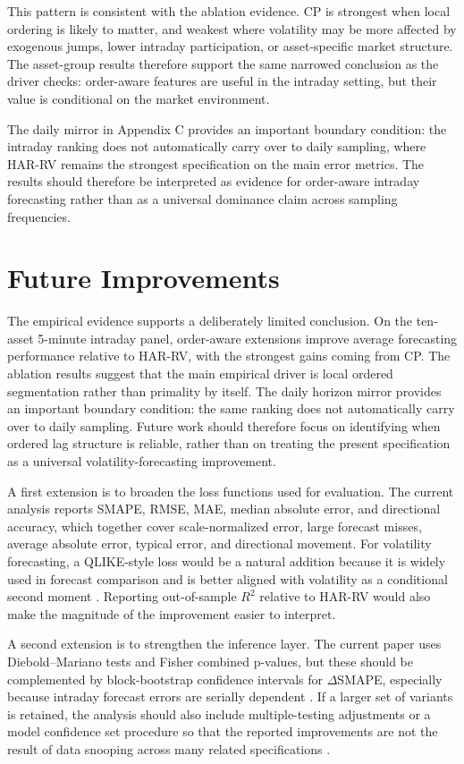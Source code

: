 \documentclass[11pt,a4paper]{article}
\begin{document}
\noindent
This pattern is consistent with the ablation evidence. CP is strongest when local ordering is likely to matter, and weakest where volatility may be more affected by exogenous jumps, lower intraday participation, or asset-specific market structure. The asset-group results therefore support the same narrowed conclusion as the driver checks: order-aware features are useful in the intraday setting, but their value is conditional on the market environment.

\noindent
The daily mirror in Appendix C provides an important boundary condition: the intraday ranking does not automatically carry over to daily sampling, where HAR-RV remains the strongest specification on the main error metrics. The results should therefore be interpreted as evidence for order-aware intraday forecasting rather than as a universal dominance claim across sampling frequencies.

\section{Future Improvements}

\noindent
The empirical evidence supports a deliberately limited conclusion. On the ten-asset 5-minute intraday panel, order-aware extensions improve average forecasting performance relative to HAR-RV, with the strongest gains coming from CP. The ablation results suggest that the main empirical driver is local ordered segmentation rather than primality by itself. The daily horizon mirror provides an important boundary condition: the same ranking does not automatically carry over to daily sampling. Future work should therefore focus on identifying when ordered lag structure is reliable, rather than on treating the present specification as a universal volatility-forecasting improvement.

\noindent
A first extension is to broaden the loss functions used for evaluation. The current analysis reports SMAPE, RMSE, MAE, median absolute error, and directional accuracy, which together cover scale-normalized error, large forecast misses, average absolute error, typical error, and directional movement. For volatility forecasting, a QLIKE-style loss would be a natural addition because it is widely used in forecast comparison and is better aligned with volatility as a conditional second moment \cite{patton2011}. Reporting out-of-sample $R^2$ relative to HAR-RV would also make the magnitude of the improvement easier to interpret.

\noindent
A second extension is to strengthen the inference layer. The current paper uses Diebold--Mariano tests and Fisher combined p-values, but these should be complemented by block-bootstrap confidence intervals for $\Delta$SMAPE, especially because intraday forecast errors are serially dependent \cite{politis1994}. If a larger set of variants is retained, the analysis should also include multiple-testing adjustments or a model confidence set procedure so that the reported improvements are not the result of data snooping across many related specifications \cite{hansen2011,white2000}.
\end{document}
